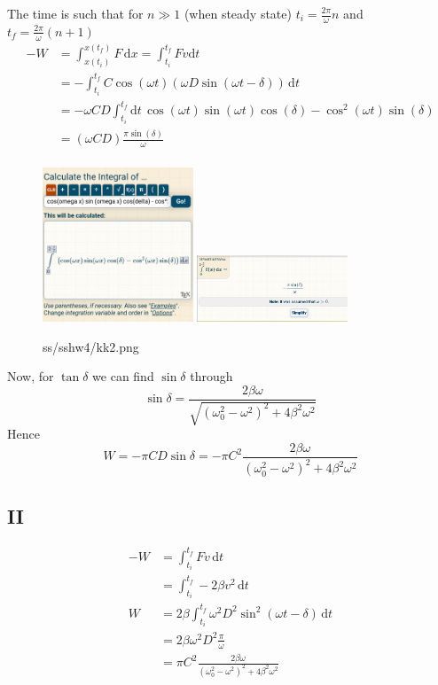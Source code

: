 \documentclass[12pt,letter]{article}
\begin{document}
The time is such that for $n\gg 1$ (when steady state) $t_i = \frac{2\pi}{\omega } n $ and $t_f = \frac{2 \pi }{\omega}(n+1)$
\begin{align*}
	-W &= \int_{x(t_i)}^{x(t_f)}  F \, \mathrm{d} x = \int_{t_i}^{t_f} F v \mathrm{d} t \\
	&=- \int_{t_i}^{t_f} C \cos(\omega t) \left(\omega D \sin(\omega t - \delta)\right)   \, \mathrm{d}  t\\ 
	&=- \omega C D \int_{t_i}^{t_f}\mathrm{d} t\,  \cos(\omega t)\sin( \omega t) \cos(\delta) - \cos ^2 (\omega t) \sin(\delta)  \\
	&= (\omega C D )\frac{\pi \sin(\delta)}{\omega} \\
\end{align*}
\begin{figure}[H]
	\centering
	\includegraphics[width=0.4\textwidth]{ss/sshw4/kk1.png}
	\includegraphics[width=0.4\textwidth]{ss/sshw4/kk2.png}
	\caption{ss/sshw4/kk2.png}
	\label{fig:ss-sshw4-kk2-png}
\end{figure}
Now, for $\tan \delta$ we can find $\sin \delta$ through 
\[
\sin \delta = \frac{2 \beta \omega}{\sqrt{(\omega_0 ^2 - \omega^2 )^2 + 4 \beta^2 \omega^2} }
\] 
Hence 
\[
W = - \pi CD \sin \delta  = \boxed{
- \pi C^2 \frac{2 \beta \omega }{(\omega_0 ^2 - \omega^2 )^2 + 4 \beta^2 \omega^2}
}\]

\subsection*{II}
\begin{align*}
	-W &= \int_{t_i}^{t_f}  F  v \, \mathrm{d} t \\ 
	&= \int_{t_i}^{t_f} -2 \beta v^2 \, \mathrm{d} t  \\
	W &= 2 \beta \int_{t_i}^{t_f} \omega^2 D^2 \sin ^2\left(\omega t - \delta\right) \, \mathrm{d} t   \\
	&= 2 \beta \omega^2 D^2 \frac{\pi}{\omega} \\
	&= \boxed{
	\pi C^2 \frac{2 \beta \omega}{\left(\omega_0^2 - \omega^2\right)^2 + 4 \beta^2 \omega^2} }\\
\end{align*}
\end{document}
